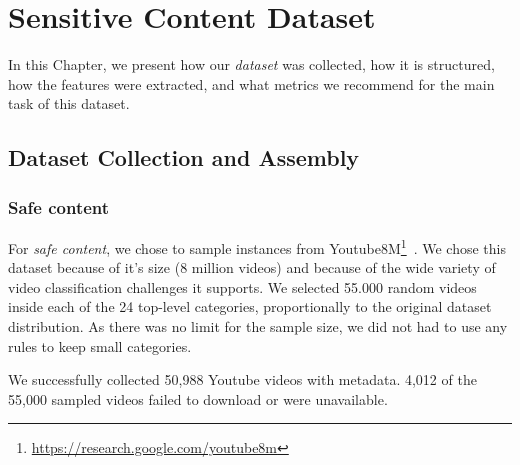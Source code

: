 \newpage

\chapter{Sensitive Content Dataset}
\label{chap:dataset}

In this Chapter, we present how our \textit{dataset} was collected, how it is structured, how the features were extracted, and what metrics we recommend for the main task of this dataset.

\section{Dataset Collection and Assembly}\label{sec:dataset-collection}




\subsection{Safe content}\label{subsec:dataset-safe}

For \textit{safe content}, we chose to sample instances from Youtube8M\footnote{\url{https://research.google.com/youtube8m}}~\cite{abu2016youtube}. We chose this dataset because of it's size (8 million videos) and because of the wide variety of video classification challenges it supports. We selected 55.000 random videos inside each of the 24 top-level categories, proportionally to the original dataset distribution. As there was no limit for the sample size, we did not had to use any rules to keep small categories. 

We successfully collected 50,988 Youtube videos with metadata. 4,012 of the 55,000 sampled videos failed to download or were unavailable. 

